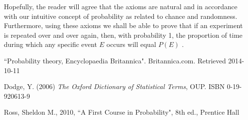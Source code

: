 \documentclass[a4paper,twocolumn]{article}
\begin{document}
\bigskip

Hopefully, the reader will agree that the axioms are natural and in accordance with our intuitive concept of probability as related to chance and randomness. Furthermore, using these axioms we shall be able to prove that if an experiment is repeated over and over again, then, with probability 1, the proportion of time during which any specific event $E$ occurs will equal $P(E)$ \cite{ross_2010}.



\begin{thebibliography}{9}
         ``Probability theory, Encyclopaedia Britannica".
         Britannica.com.
         Retrieved 2014-10-11

        Dodge, Y. (2006)
        \textit{The Oxford Dictionary of Statistical Terms}, OUP.
        ISBN 0-19-920613-9

        Ross, Sheldon M.,
        2010,
        ``A First Course in Probability", 8th ed.,
        Prentice Hall
\end{thebibliography}
\end{document}
